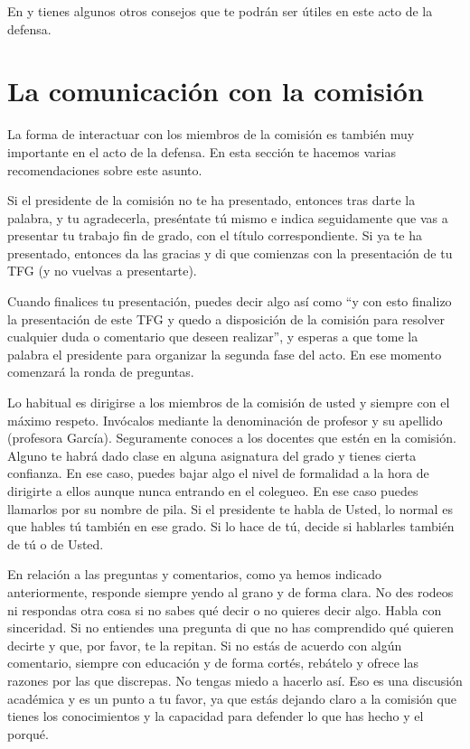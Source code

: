 En \cite{vallejo2009defensa} y tienes algunos otros consejos que te podrán ser útiles en este acto de la defensa.

\section{La comunicación con la comisión}

La forma de interactuar con los miembros de la comisión es también muy importante en el acto de la defensa. En esta sección te hacemos varias recomendaciones sobre este asunto.

Si el presidente de la comisión no te ha presentado, entonces tras darte la palabra, y tu agradecerla, preséntate tú mismo e indica seguidamente que vas a presentar tu trabajo fin de grado, con el título correspondiente. Si ya te ha presentado, entonces da las gracias y di que comienzas con la presentación de tu TFG (y no vuelvas a presentarte). 

Cuando finalices tu presentación, puedes decir algo así como ``y con esto finalizo la presentación de este TFG y quedo a disposición de la comisión para resolver cualquier duda o comentario que deseen realizar'', y esperas a que tome la palabra el presidente para organizar la segunda fase del acto. En ese momento comenzará la ronda de preguntas. 

Lo habitual es dirigirse a los miembros de la comisión de usted y siempre con el máximo respeto. Invócalos mediante la denominación de profesor y su apellido (profesora García). Seguramente conoces a los docentes que estén en la comisión. Alguno te habrá dado clase en alguna asignatura del grado y tienes cierta confianza. En ese caso, puedes bajar algo el nivel de formalidad a la hora de dirigirte a ellos aunque nunca entrando en el colegueo. En ese caso puedes llamarlos por su nombre de pila. Si el presidente te habla de Usted, lo normal es que hables tú también en ese grado. Si lo hace de tú, decide si hablarles también de tú o de Usted. 

En relación a las preguntas y comentarios, como ya hemos indicado anteriormente, responde siempre yendo al grano y de forma clara. No des rodeos ni respondas otra cosa si no sabes qué decir o no quieres decir algo. Habla con sinceridad. Si no entiendes una pregunta di que no has comprendido qué quieren decirte y que, por favor, te la repitan. Si no estás de acuerdo con algún comentario, siempre con educación y de forma cortés, rebátelo y ofrece las razones por las que discrepas. No tengas miedo a hacerlo así. Eso es una discusión académica y es un punto a tu favor, ya que estás dejando claro a la comisión que tienes los conocimientos y la capacidad para defender lo que has hecho y el porqué.

